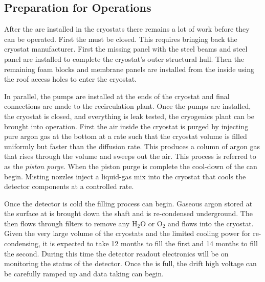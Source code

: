 %

\subsection{Preparation for Operations}

After the  are installed in the cryostats there remains a lot
of work before they can be operated. First the 
must be closed. This requires bringing back the cryostat manufacturer. 
First the missing panel with the steel beams
and steel panel are installed to complete the cryostat's outer
structural hull. Then the remaining foam blocks and membrane panels
are installed from the inside using the roof access holes 
to enter the cryostat. 

In parallel, the \lar pumps are installed at
the ends of the cryostat and final connections are made to the
recirculation plant. Once the pumps are installed, the cryostat is
closed, and everything is leak tested, the cryogenics plant can be
brought into operation. First the air inside the cryostat is purged by
injecting pure argon gas at the bottom %
at a rate such
that the %
cryostat volume is filled uniformly but faster than the diffusion
rate. This produces a column of argon gas that rises through the volume %
and sweeps out the air. This process is referred to as the \textit{piston
purge}. When the piston purge is complete the cool-down of the 
can begin. Misting nozzles inject a liquid-gas mix into the cryostat
that cools the detector components at a controlled rate. 

Once the detector is
cold the filling process can begin. Gaseous argon stored at the surface 
at \surf is brought down the shaft and is re-condensed underground. The \lar then flows through filters to remove any H$_2$O or O$_2$ and
flows into the cryostat. Given the very large volume of the cryostats
and the limited cooling power for re-condensing, it is  %
expected to take \num{12} months to fill the first  and \num{14} months to
fill the second. During this time the detector readout electronics
will be on monitoring the status of the detector. %
Once the
 is full, the drift high voltage can be carefully ramped up and
data taking can begin.


